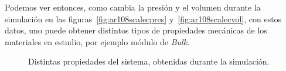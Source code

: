 Podemos ver entonces, como cambia la presi\'on y el volumen durante la simulaci\'on en las figuras~\ref{fig:ar108scalecpres} y~\ref{fig:ar108scalecvol}, con estos datos, uno puede obtener distintos tipos de propiedades mec\'anicas de los materiales en estudio, por ejemplo m\'odulo de \textit{Bulk}.

\begin{figure}[!ht]
\centering
{}
\caption{Distintas propiedades del sistema, obtenidas durante la simulaci\'on.}
\label{fig:ar108scalec}
\end{figure}


